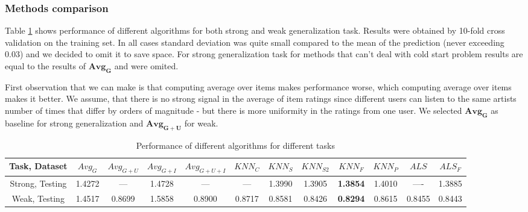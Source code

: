 \documentclass{article} %
\begin{document}
\subsubsection{Methods comparison}


 

Table \ref{table:Algorithms} shows performance of different algorithms for both
strong and weak generalization task. Results were obtained by 10-fold cross
validation on the training set. In all cases standard deviation was quite small
compared to the mean of the prediction (never exceeding 0.03) and we decided to
omit it to save space. For strong generalization task for methods that can't
deal with cold start problem results are equal to the results of $\bm{Avg_G}$ and were omited.

First observation that we can make is that computing average over items makes
performance worse, which computing average over items makes it better. We
assume, that there is no strong signal in the average of item ratings since
different users can listen to the same artists number of times that differ by
orders of magnitude - but there is more uniformity in the ratings from one user.
We selected $\bm {Avg_G}$ as baseline for strong generalization and
$\bm{Avg_{G+U}}$ for weak.

\begin{table}[!t]
\hspace*{-1cm}
\bgroup
\setlength{\tabcolsep}{.16667em}	
\begin{tabular}{| c | c | c | c | c | c | c | c | c | c | c | c |}
\hline
Task, Dataset & $Avg_G$ & $Avg_{G+U}$ & $Avg_{G+I}$ & $Avg_{G+U+I}$ & 
$KNN_C$ & $KNN_S$ & $KNN_{S2}$ & $KNN_F$ & $KNN_P$ & $ALS$ & $ALS_F$ \\ \hline
  Strong, Testing & 1.4272 & --- & 1.4728 & --- & --- & 1.3990 & 1.3905 &
 \textbf{1.3854} & 1.4010 & ---- & 1.3885 \\ \hline
 Weak, Testing & 1.4517 & 0.8699 & 1.5858 & 0.8900 & 0.8717 & 0.8581 & 0.8426 &
 \textbf{0.8294} & 0.8615 & 0.8455 & 0.8443 \\ \hline
\end{tabular}
\caption{Performance of different algorithms for different tasks}
\label{table:Algorithms}
\egroup
\end{table} 
 
\end{document}
